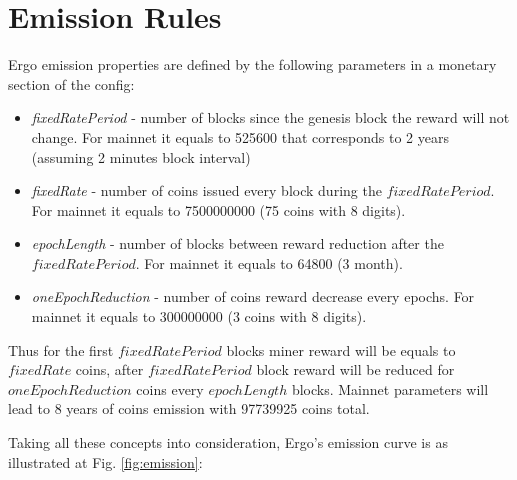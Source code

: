 \section{Emission Rules}
Ergo emission properties are defined by the following parameters in a monetary section of the config:

\begin{itemize}
    \item{\em fixedRatePeriod } - number of blocks since the genesis block the reward will not change.
    For mainnet it equals to 525600 that corresponds to 2 years (assuming 2 minutes block interval)
    \item{\em fixedRate } - number of coins issued every block during the $fixedRatePeriod$.
    For mainnet it equals to 7500000000 (75 coins with 8 digits).
    \item{\em epochLength } - number of blocks between reward reduction after the $fixedRatePeriod$.
    For mainnet it equals to 64800 (3 month).
    \item{\em oneEpochReduction } - number of coins reward decrease every epochs.
    For mainnet it equals to 300000000 (3 coins with 8 digits).
\end{itemize}

Thus for the first $fixedRatePeriod$ blocks miner reward will be equals to $fixedRate$ \ergo{} coins,
after $fixedRatePeriod$ block reward will be reduced for $oneEpochReduction$ coins every $epochLength$ blocks.
Mainnet parameters will lead to 8 years of coins emission with 97739925 coins total.

Taking all these concepts into consideration, Ergo's emission curve is as illustrated at Fig. \ref{fig:emission}:


